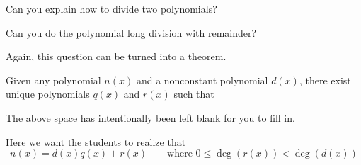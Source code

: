 \begin{question} 
Can you explain how to divide two polynomials? 
\end{question}
\QM

\begin{question} 
Can you do the polynomial long division with remainder?
\end{question}
\QM

Again, this question can be turned into a theorem.

\begin{theorem}
Given any polynomial $n(x)$ and a nonconstant polynomial $d(x)$, there exist unique
polynomials $q(x)$ and $r(x)$ such that
\vspace{1in}
\end{theorem}
\noindent The above space has intentionally been left blank for you to
fill in.
\begin{teachingnote}
Here we want the students to realize that
\[
n(x) = d(x)q(x) + r(x)\qquad\text{where } 0 \le \deg(r(x)) < \deg(d(x)) 
\]
\end{teachingnote}




